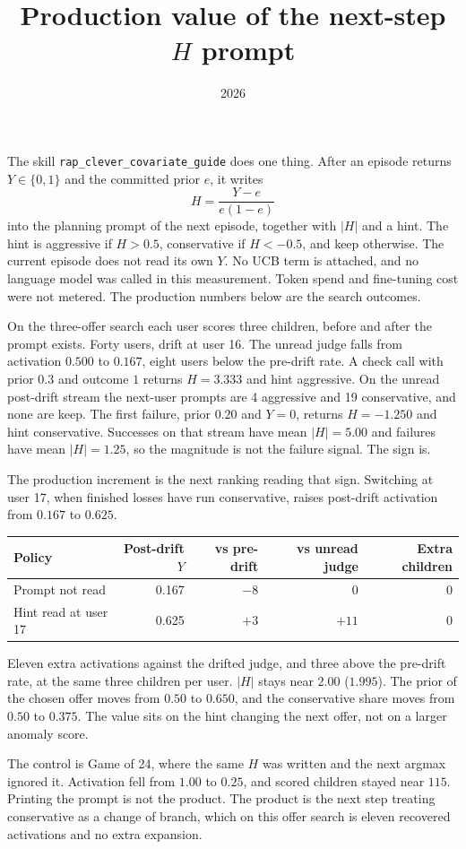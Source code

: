 \documentclass[11pt,a4paper]{article}
\title{Production value of the next-step \(H\) prompt}
\author{}
\date{2026}
\begin{document}
\maketitle

The skill \texttt{rap\_clever\_covariate\_guide} does one thing.
After an episode returns \(Y\in\{0,1\}\) and the committed prior \(e\), it writes
\[
H=\frac{Y-e}{e(1-e)}
\]
into the planning prompt of the next episode, together with \(|H|\) and a hint.
The hint is aggressive if \(H>0.5\), conservative if \(H<-0.5\), and keep otherwise.
The current episode does not read its own \(Y\).
No UCB term is attached, and no language model was called in this measurement.
Token spend and fine-tuning cost were not metered.
The production numbers below are the search outcomes.

On the three-offer search each user scores three children, before and after the prompt exists.
Forty users, drift at user 16.
The unread judge falls from activation \(0.500\) to \(0.167\), eight users below the pre-drift rate.
A check call with prior \(0.3\) and outcome \(1\) returns \(H=3.333\) and hint aggressive.
On the unread post-drift stream the next-user prompts are 4 aggressive and 19 conservative, and none are keep.
The first failure, prior \(0.20\) and \(Y=0\), returns \(H=-1.250\) and hint conservative.
Successes on that stream have mean \(|H|=5.00\) and failures have mean \(|H|=1.25\), so the magnitude is not the failure signal.
The sign is.

The production increment is the next ranking reading that sign.
Switching at user 17, when finished losses have run conservative, raises post-drift activation from \(0.167\) to \(0.625\).

\begin{center}
\begin{tabular}{lrrrr}
\toprule
Policy & Post-drift \(Y\) & vs pre-drift & vs unread judge & Extra children \\
\midrule
Prompt not read & 0.167 & \(-8\) & 0 & 0 \\
Hint read at user 17 & 0.625 & \(+3\) & \(+11\) & 0 \\
\bottomrule
\end{tabular}
\end{center}

Eleven extra activations against the drifted judge, and three above the pre-drift rate, at the same three children per user.
\(|H|\) stays near \(2.00\) (\(1.995\)).
The prior of the chosen offer moves from \(0.50\) to \(0.650\), and the conservative share moves from \(0.50\) to \(0.375\).
The value sits on the hint changing the next offer, not on a larger anomaly score.

The control is Game of 24, where the same \(H\) was written and the next argmax ignored it.
Activation fell from \(1.00\) to \(0.25\), and scored children stayed near \(115\).
Printing the prompt is not the product.
The product is the next step treating conservative as a change of branch, which on this offer search is eleven recovered activations and no extra expansion.
\end{document}
